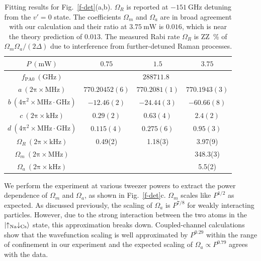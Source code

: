 \documentclass[aps,prl,twocolumn,10pt,superscriptaddress]{revtex4-1}
\begin{document}
\begin{table}[ht]
  \centering
  \begin{tabular}{|c|c|c|c|}
    $P~(\mathrm{mW})$&$0.75$&$1.5$&$3.75$\\\hline
    $f_{\mathrm{PA}0}~(\mathrm{GHz})$&\multicolumn{3}{|c|}{$288711.8$}\\\hline
    $a~(\mathrm{2\pi\times MHz})$&$770.20452(6)$&$770.2081(1)$&$770.1943(3)$\\
    $b~(\mathrm{4\pi^2\times MHz\cdot GHz})$&$-12.46(2)$&$-24.44(3)$&$-60.66(8)$\\\hline
    $c~(\mathrm{2\pi\times kHz})$&$0.29(2)$&$0.63(4)$&$2.4(2)$\\
    $d~(\mathrm{4\pi^2\times MHz\cdot GHz})$&$0.115(4)$&$0.275(6)$&$0.95(3)$\\ \hline
    $\Omega_R~(\mathrm{2\pi\times kHz})$ & 0.49(2) & 1.18(3) & 3.97(9) \\
    $\Omega_m~(\mathrm{2\pi\times MHz})$ & & & 348.3(3) \\
    $\Omega_a~(\mathrm{2\pi\times kHz})$ & & & 5.5(2)
  \end{tabular}
  \caption{Fitting results for Fig.~\ref{f-det}(a,b). $\Omega_R$ is reported at $-151~\mathrm{GHz}$ detuning from the $v' = 0$ state.  The coefficients $\Omega_m$ and $\Omega_a$ are in broad agreement with our calculation and their ratio at $3.75~\mathrm{mW}$ is $0.016$, which is near the theory prediction of $0.013$.  The measured Rabi rate $\Omega_R$ is ZZ~\% of $\Omega_m \Omega_a/(2\Delta)$ due to interference from further-detuned Raman processes.
    \label{tab:f-det:fit}}
\end{table}

We perform the experiment at various tweezer powers to extract the power dependence of $ \Omega_m $ and $ \Omega_a $, as shown in Fig.~\ref{f-det}c. $ \Omega_m $ scales like $ P^{1/2} $ as expected. As discussed previously, the scaling of $ \Omega_a $ is $P^{7/8}$ for weakly interacting particles.
However, due to the strong interaction between the two atoms in the $\ket{\uparrow_{\text{Na}}\downarrow_{\text{Cs}}}$ state, this approximation breaks down.
Coupled-channel calculations show that the wavefunction scaling
is well approximated by $P^{0.29}$ within the range of confinement in our experiment and the expected scaling of $ \Omega_a \propto P^{0.79} $ agrees with the data.
\end{document}
